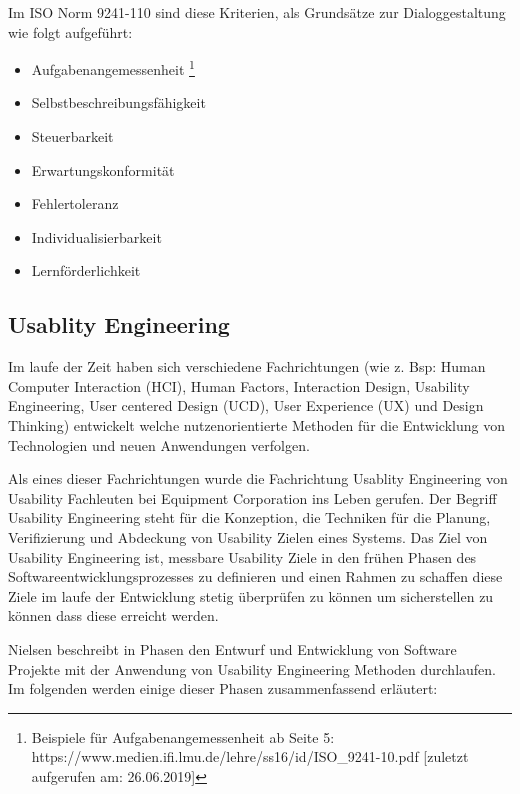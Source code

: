 Im ISO Norm  9241-110 sind diese Kriterien, als Grundsätze zur Dialoggestaltung wie folgt aufgeführt:

\begin{itemize}
	\item Aufgabenangemessenheit \footnote{Beispiele für Aufgabenangemessenheit ab Seite 5: https://www.medien.ifi.lmu.de/lehre/ss16/id/ISO\_9241-10.pdf [zuletzt aufgerufen am: 26.06.2019]}
	\item Selbstbeschreibungsfähigkeit
	\item Steuerbarkeit
	\item Erwartungskonformität
	\item Fehlertoleranz
	\item Individualisierbarkeit
	\item Lernförderlichkeit
\end{itemize}

\subsection{Usablity Engineering}

\cite{MichaelRichter2016} Im laufe der Zeit haben sich verschiedene Fachrichtungen (wie z. Bsp: Human Computer Interaction (HCI), Human Factors, Interaction Design, Usability Engineering, 
User centered Design (UCD), User Experience (UX) und Design Thinking) entwickelt welche nutzenorientierte Methoden für die Entwicklung von Technologien und neuen Anwendungen verfolgen. 

\cite[S.~14]{MaryBethRossonJohnM.CarrollDianeD.Cerra2002} Als eines dieser Fachrichtungen wurde die Fachrichtung Usablity Engineering von Usability Fachleuten bei Equipment Corporation ins Leben gerufen.  
Der Begriff Usability Engineering steht für die Konzeption, die Techniken für die Planung, Verifizierung und Abdeckung von Usability Zielen eines Systems. Das Ziel von Usability Engineering ist, 
messbare Usability Ziele in den frühen Phasen des Softwareentwicklungsprozesses zu definieren und einen Rahmen zu schaffen diese Ziele im laufe der Entwicklung stetig überprüfen zu können 
um sicherstellen zu können dass diese erreicht werden.

Nielsen beschreibt in \cite{Nielsen1994} Phasen den Entwurf und Entwicklung von Software Projekte mit der Anwendung von Usability Engineering Methoden durchlaufen. 
Im folgenden werden einige dieser Phasen zusammenfassend erläutert: 

